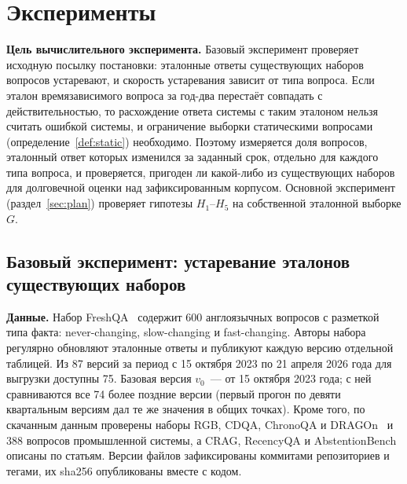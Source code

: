 \documentclass{article}
\begin{document}
\section{Эксперименты}\label{sec:exp}

\textbf{Цель вычислительного эксперимента.} Базовый эксперимент проверяет исходную посылку постановки: эталонные ответы существующих наборов вопросов устаревают, и скорость устаревания зависит от типа вопроса. Если эталон времязависимого вопроса за год-два перестаёт совпадать с действительностью, то расхождение ответа системы с таким эталоном нельзя считать ошибкой системы, и ограничение выборки статическими вопросами (определение~\ref{def:static}) необходимо. Поэтому измеряется доля вопросов, эталонный ответ которых изменился за заданный срок, отдельно для каждого типа вопроса, и проверяется, пригоден ли какой-либо из существующих наборов для долговечной оценки над зафиксированным корпусом. Основной эксперимент (раздел~\ref{sec:plan}) проверяет гипотезы $H_1$--$H_5$ на собственной эталонной выборке $G$.

\subsection{Базовый эксперимент: устаревание эталонов существующих наборов}\label{sec:base}

\textbf{Данные.} Набор FreshQA~\cite{vu2023freshllms} содержит 600 англоязычных вопросов с разметкой типа факта: never-changing, slow-changing и fast-changing. Авторы набора регулярно обновляют эталонные ответы и публикуют каждую версию отдельной таблицей. Из 87 версий за период с 15 октября 2023 по 21 апреля 2026 года для выгрузки доступны 75. Базовая версия $v_0$~--- от 15 октября 2023 года; с ней сравниваются все 74 более поздние версии (первый прогон по девяти квартальным версиям дал те же значения в общих точках). Кроме того, по скачанным данным проверены наборы RGB, CDQA, ChronoQA и DRAGOn~\cite{chen2023rgb,xu2024cdqa,chen2025chronoqa,chernogorskii2025dragon} и 388 вопросов промышленной системы, а CRAG, RecencyQA и AbstentionBench~\cite{yang2024crag,piryani2026recency,kirichenko2025abstentionbench} описаны по статьям. Версии файлов зафиксированы коммитами репозиториев и тегами, их sha256 опубликованы вместе с кодом.
\end{document}
